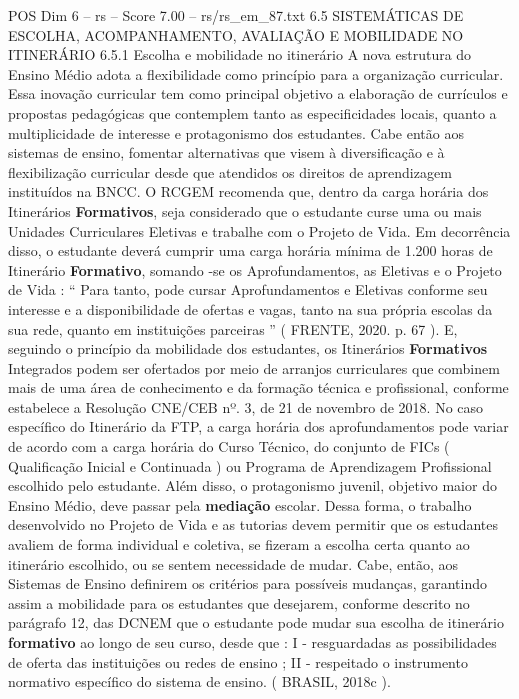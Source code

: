 \begin{textsample}{POS Dim 6 – rs – Score 7.00 – rs/rs\_em\_87.txt}  \label{ex:f6_pos_189}
6.5 SISTEMÁTICAS DE ESCOLHA, ACOMPANHAMENTO, AVALIAÇÃO E MOBILIDADE NO ITINERÁRIO 6.5.1 Escolha e mobilidade no itinerário A nova estrutura do Ensino Médio adota a flexibilidade como princípio para a organização curricular.
Essa inovação curricular tem como principal objetivo a elaboração de currículos e propostas pedagógicas que contemplem tanto as especificidades locais, quanto a multiplicidade de interesse e protagonismo dos estudantes.
Cabe então aos sistemas de ensino, fomentar alternativas que visem à diversificação e à flexibilização curricular desde que atendidos os direitos de aprendizagem instituídos na BNCC.
O RCGEM recomenda que, dentro da carga horária dos Itinerários \textbf{Formativos}, seja considerado que o estudante curse uma ou mais Unidades Curriculares Eletivas e trabalhe com o Projeto de Vida.
Em decorrência disso, o estudante deverá cumprir uma carga horária mínima de 1.200 horas de Itinerário \textbf{Formativo}, somando -se os Aprofundamentos, as Eletivas e o Projeto de Vida : “ Para tanto, pode cursar Aprofundamentos e Eletivas conforme seu interesse e a disponibilidade de ofertas e vagas, tanto na sua própria escolas da sua rede, quanto em instituições parceiras ” ( FRENTE, 2020. p. 67 ).
E, seguindo o princípio da mobilidade dos estudantes, os Itinerários \textbf{Formativos} Integrados podem ser ofertados por meio de arranjos curriculares que combinem mais de uma área de conhecimento e da formação técnica e profissional, conforme estabelece a Resolução CNE/CEB nº. 3, de 21 de novembro de 2018.
No caso específico do Itinerário da FTP, a carga horária dos aprofundamentos pode variar de acordo com a carga horária do Curso Técnico, do conjunto de FICs ( Qualificação Inicial e Continuada ) ou Programa de Aprendizagem Profissional escolhido pelo estudante.
Além disso, o protagonismo juvenil, objetivo maior do Ensino Médio, deve passar pela \textbf{mediação} escolar.
Dessa forma, o trabalho desenvolvido no Projeto de Vida e as tutorias devem permitir que os estudantes avaliem de forma individual e coletiva, se fizeram a escolha certa quanto ao itinerário escolhido, ou se sentem necessidade de mudar.
Cabe, então, aos Sistemas de Ensino definirem os critérios para possíveis mudanças, garantindo assim a mobilidade para os estudantes que desejarem, conforme descrito no parágrafo 12, das DCNEM que o estudante pode mudar sua escolha de itinerário \textbf{formativo} ao longo de seu curso, desde que : I - resguardadas as possibilidades de oferta das instituições ou redes de ensino ; II - respeitado o instrumento normativo específico do sistema de ensino. ( BRASIL, 2018c ).

\end{textsample}
